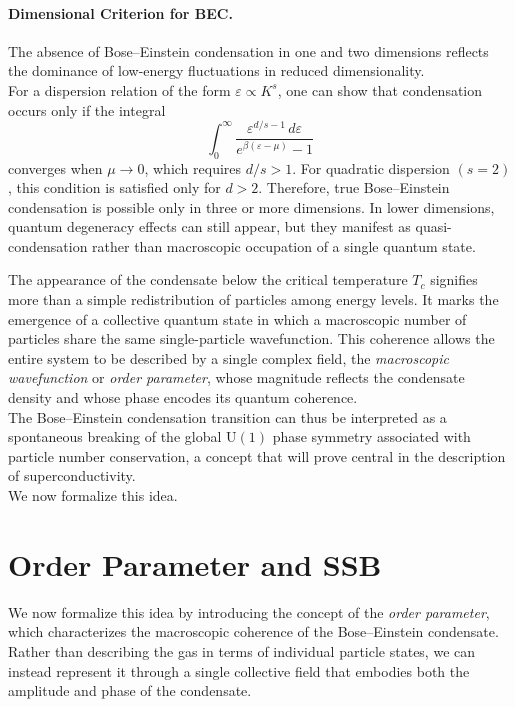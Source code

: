 \paragraph{Dimensional Criterion for BEC.}\label{crit}
The absence of Bose--Einstein condensation in one and two dimensions reflects the dominance of low-energy fluctuations in reduced dimensionality.\\
For a dispersion relation of the form \(\varepsilon \propto K^s\), one can show that condensation occurs only if the integral
\begin{equation}
    \int_0^{\infty} \frac{\varepsilon^{d/s - 1}\, d\varepsilon}{e^{\beta(\varepsilon - \mu)} - 1}
    \label{convergence}
\end{equation}
converges when \(\mu \to 0\), which requires \(d/s > 1\).  
For quadratic dispersion $(s = 2)$, this condition is satisfied only for $d > 2$.
Therefore, true Bose–Einstein condensation is possible only in three or more dimensions.
In lower dimensions, quantum degeneracy effects can still appear, but they manifest as quasi-condensation rather than macroscopic occupation of a single quantum state.

The appearance of the condensate below the critical temperature $T_c$ signifies more than a simple redistribution of particles among energy levels.
It marks the emergence of a collective quantum state in which a macroscopic number of particles share the same single-particle wavefunction.
This coherence allows the entire system to be described by a single complex field, the \textit{macroscopic wavefunction} or \textit{order parameter}, whose magnitude reflects the condensate density and whose phase encodes its quantum coherence.\\
The Bose–Einstein condensation transition can thus be interpreted as a spontaneous breaking of the global $\mathrm{U}(1)$ phase symmetry associated with particle number conservation, a concept that will prove central in the description of superconductivity.\\
We now formalize this idea.

\section{Order Parameter and SSB}
We now formalize this idea by introducing the concept of the \textit{order parameter}, which characterizes the macroscopic coherence of the Bose–Einstein condensate.
Rather than describing the gas in terms of individual particle states, we can instead represent it through a single collective field that embodies both the amplitude and phase of the condensate.

